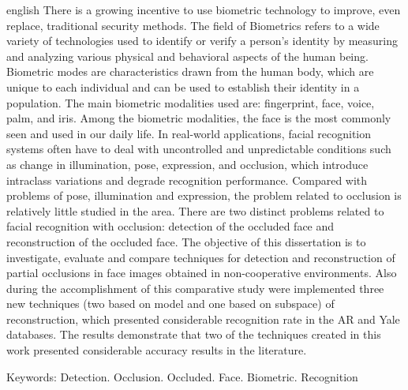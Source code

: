 \begin{resumo}[Abstract]
\begin{otherlanguage*}{english}
There is a growing incentive to use biometric technology to improve, even replace, traditional security methods. The field of Biometrics refers to a wide variety of technologies used to identify or verify a person's identity by measuring and analyzing various physical and behavioral aspects of the human being. Biometric modes are characteristics drawn from the human body, which are unique to each individual and can be used to establish their identity in a population. The main biometric modalities used are: fingerprint, face, voice, palm, and iris. Among the biometric modalities, the face is the most commonly seen and used in our daily life. In real-world applications, facial recognition systems often have to deal with uncontrolled and unpredictable conditions such as change in illumination, pose, expression, and occlusion, which introduce intraclass variations and degrade recognition performance. Compared with problems of pose, illumination and expression, the problem related to occlusion is relatively little studied in the area. There are two distinct problems related to facial recognition with occlusion: detection of the occluded face and reconstruction of the occluded face. The objective of this dissertation is to investigate, evaluate and compare techniques for detection and reconstruction of partial occlusions in face images obtained in non-cooperative environments. Also during the accomplishment of this comparative study were implemented three new techniques (two based on model and one based on subspace) of reconstruction, which presented considerable recognition rate in the AR and Yale databases. The results demonstrate that two of the techniques created in this work presented considerable accuracy results in the literature.

Keywords: Detection. Occlusion. Occluded. Face. Biometric. Recognition
\end{otherlanguage*}
\end{resumo}


\listoffigures*
\cleardoublepage


\listofalgorithms
\cleardoublepage

\listoftables*
\cleardoublepage



\listofquadros*
\cleardoublepage
%
%



